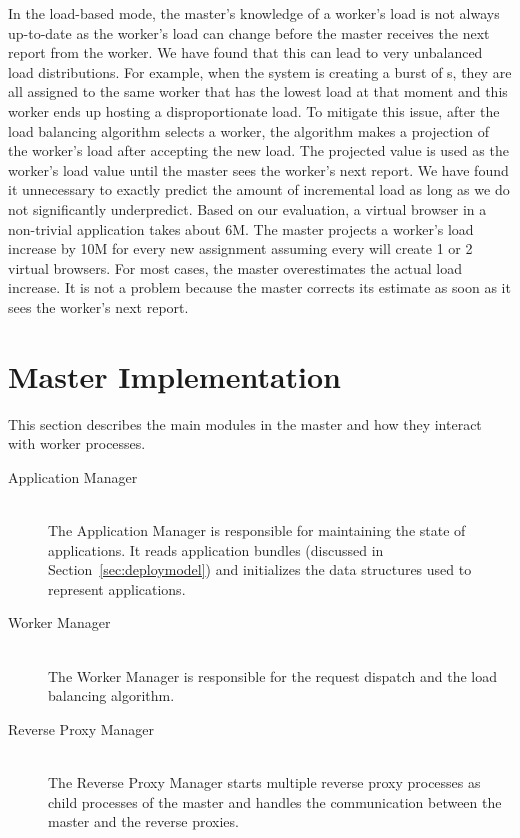 In the load-based mode, the master's knowledge of a worker's load is not
always up-to-date as the worker's load can change before the master receives the
next report from the worker. We have found that this can lead to very unbalanced load
distributions. For example, when the system is creating a burst of \appins{}s,
they are all assigned to the same worker that has the lowest load at that
moment and this worker ends up hosting a disproportionate load.  To mitigate
this issue,  after the load balancing algorithm selects a worker, the
algorithm makes a projection of the worker's load after accepting the new
load. The projected value is used as the worker's load value  until the master
sees the worker's next report.  We have found it unnecessary to exactly 
predict the amount of incremental load as long as we do not significantly 
underpredict.  Based on our evaluation, a virtual
browser in a non-trivial application takes about 6M.  The master projects a
worker's load increase by 10M for every new \appins assignment assuming every
\appins will create 1 or 2 virtual browsers.  For most cases, the master
overestimates the actual load increase. It is not a problem because the master
corrects its estimate as soon as it sees the worker's next report. 

\section{Master Implementation}

This section describes the main modules in the master and how they interact
with worker processes.

\begin{description}
\item[Application Manager] \hfill \\
The Application Manager is responsible for maintaining the state of applications. 
It reads application bundles (discussed in Section~\ref{sec:deploymodel}) and
initializes the data structures used to represent applications.

\item[Worker Manager] \hfill \\
The Worker Manager is responsible for the request dispatch
and the load balancing algorithm.

\item[Reverse Proxy Manager] \hfill \\
The Reverse Proxy Manager starts multiple reverse proxy processes as child
processes of the master and handles the communication between the master and
the reverse proxies.
\end{description}

